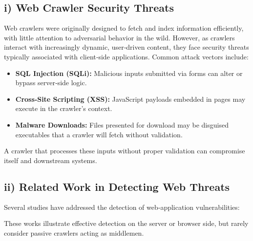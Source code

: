 \subsection*{i) Web Crawler Security Threats}
Web crawlers were originally designed to fetch and index information efficiently, with little attention to adversarial behavior in the wild. However, as crawlers interact with increasingly dynamic, user‐driven content, they face security threats typically associated with client‐side applications. Common attack vectors include:

\begin{itemize}[topsep=4pt,itemsep=2pt]
  \item \textbf{SQL Injection (SQLi):} Malicious inputs submitted via forms can alter or bypass server‐side logic.
  \item \textbf{Cross‐Site Scripting (XSS):} JavaScript payloads embedded in pages may execute in the crawler’s context.
  \item \textbf{Malware Downloads:} Files presented for download may be disguised executables that a crawler will fetch without validation.
\end{itemize}

A crawler that processes these inputs without proper validation can compromise itself and downstream systems.

\subsection*{ii) Related Work in Detecting Web Threats}
Several studies have addressed the detection of web‐application vulnerabilities:


These works illustrate effective detection on the server or browser side, but rarely consider passive crawlers acting as middlemen.

